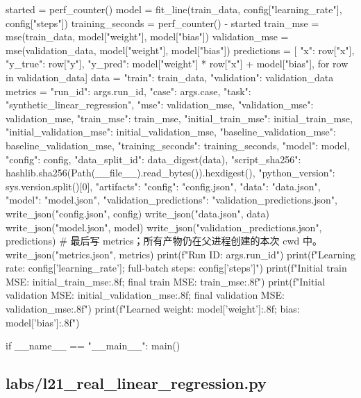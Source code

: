 \documentclass[UTF8,zihao=-4,fontset=fandol]{ctexart}
\begin{document}
\begin{Code}
    started = perf_counter()
    model = fit_line(train_data, config["learning_rate"], config["steps"])
    training_seconds = perf_counter() - started
    train_mse = mse(train_data, model["weight"], model["bias"])
    validation_mse = mse(validation_data, model["weight"], model["bias"])
    predictions = [{
        "x": row["x"], "y_true": row["y"],
        "y_pred": model["weight"] * row["x"] + model["bias"],
    } for row in validation_data]
    data = {"train": train_data, "validation": validation_data}
    metrics = {
        "run_id": args.run_id, "case": args.case, "task": "synthetic_linear_regression",
        "mse": validation_mse, "validation_mse": validation_mse, "train_mse": train_mse,
        "initial_train_mse": initial_train_mse, "initial_validation_mse": initial_validation_mse,
        "baseline_validation_mse": baseline_validation_mse,
        "training_seconds": training_seconds, "model": model, "config": config,
        "data_split_id": data_digest(data),
        "script_sha256": hashlib.sha256(Path(__file__).read_bytes()).hexdigest(),
        "python_version": sys.version.split()[0],
        "artifacts": {"config": "config.json", "data": "data.json", "model": "model.json",
                      "validation_predictions": "validation_predictions.json"},
    }
    write_json("config.json", config)
    write_json("data.json", data)
    write_json("model.json", model)
    write_json("validation_predictions.json", predictions)
    # 最后写 metrics；所有产物仍在父进程创建的本次 cwd 中。
    write_json("metrics.json", metrics)
    print(f"Run ID: {args.run_id}")
    print(f"Learning rate: {config['learning_rate']}; full-batch steps: {config['steps']}")
    print(f"Initial train MSE: {initial_train_mse:.8f}; final train MSE: {train_mse:.8f}")
    print(f"Initial validation MSE: {initial_validation_mse:.8f}; final validation MSE: {validation_mse:.8f}")
    print(f"Learned weight: {model['weight']:.8f}; bias: {model['bias']:.8f}")


if __name__ == "__main__":
    main()
\end{Code}

\subsection{labs/l21\_real\_linear\_regression.py}
\end{document}
